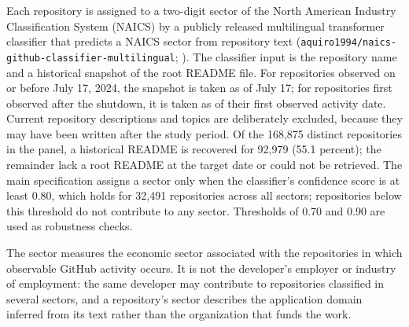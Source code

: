 Each repository is assigned to a two-digit sector of the North American Industry Classification System (NAICS) by a publicly released multilingual transformer classifier that predicts a NAICS sector from repository text (\texttt{aquiro1994/naics-github-classifier-multilingual}; \citealp{quispe2026naics}). The classifier input is the repository name and a historical snapshot of the root README file. For repositories observed on or before July 17, 2024, the snapshot is taken as of July 17; for repositories first observed after the shutdown, it is taken as of their first observed activity date. Current repository descriptions and topics are deliberately excluded, because they may have been written after the study period. Of the 168,875 distinct repositories in the panel, a historical README is recovered for 92,979 (55.1 percent); the remainder lack a root README at the target date or could not be retrieved. The main specification assigns a sector only when the classifier's confidence score is at least 0.80, which holds for 32,491 repositories across all sectors; repositories below this threshold do not contribute to any sector. Thresholds of 0.70 and 0.90 are used as robustness checks.

The sector measures the economic sector associated with the repositories in which observable GitHub activity occurs. It is not the developer's employer or industry of employment: the same developer may contribute to repositories classified in several sectors, and a repository's sector describes the application domain inferred from its text rather than the organization that funds the work.
